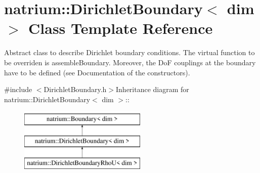 \hypertarget{classnatrium_1_1DirichletBoundary}{
\section{natrium::DirichletBoundary$<$ dim $>$ Class Template Reference}
\label{classnatrium_1_1DirichletBoundary}
}


Abstract class to describe Dirichlet boundary conditions. The virtual function to be overriden is assembleBoundary. Moreover, the DoF couplings at the boundary have to be defined (see Documentation of the constructors).  


{\ttfamily \#include $<$DirichletBoundary.h$>$}Inheritance diagram for natrium::DirichletBoundary$<$ dim $>$::\begin{figure}[H]
\begin{center}
\leavevmode
\includegraphics[height=3cm]{classnatrium_1_1DirichletBoundary}
\end{center}
\end{figure}
